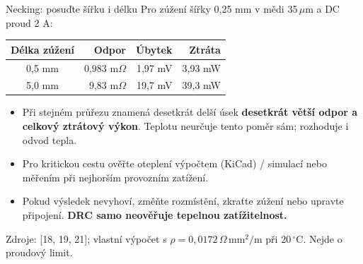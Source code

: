 \documentclass{beamer}
\begin{document}
\begin{frame}[t]{Necking: posuďte šířku i délku}
	\small
	Pro zúžení šířky 0,25 mm v mědi 35\,$\mu$m a DC proud 2 A:
	\medskip
	{\centering
	\begin{tabular}{c|r|r|r}
		Délka zúžení & Odpor & Úbytek & Ztráta\\\hline
		0,5 mm & 0,983 m$\Omega$ & 1,97 mV & 3,93 mW\\
		5,0 mm & 9,83 m$\Omega$ & 19,7 mV & 39,3 mW
	\end{tabular}\par}
	\medskip
	\begin{itemize}
		\item Při stejném průřezu znamená desetkrát delší úsek \textbf{desetkrát větší odpor a celkový ztrátový výkon}. Teplotu neurčuje tento poměr sám; rozhoduje i odvod tepla.
		\item Pro kritickou cestu ověřte oteplení výpočtem (KiCad) / simulací nebo měřením při nejhorším provozním zatížení.
		\item Pokud výsledek nevyhoví, změňte rozmístění, zkraťte zúžení nebo upravte připojení. \textbf{DRC samo neověřuje tepelnou zatížitelnost.}
	\end{itemize}
	\vfill
	{\tiny Zdroje: [18, 19, 21]; vlastní výpočet s $\rho=0{,}0172\,\Omega\,\text{mm}^2/\text{m}$ při 20\,$^\circ$C. Nejde o proudový limit.}
\end{frame}

\end{document}
